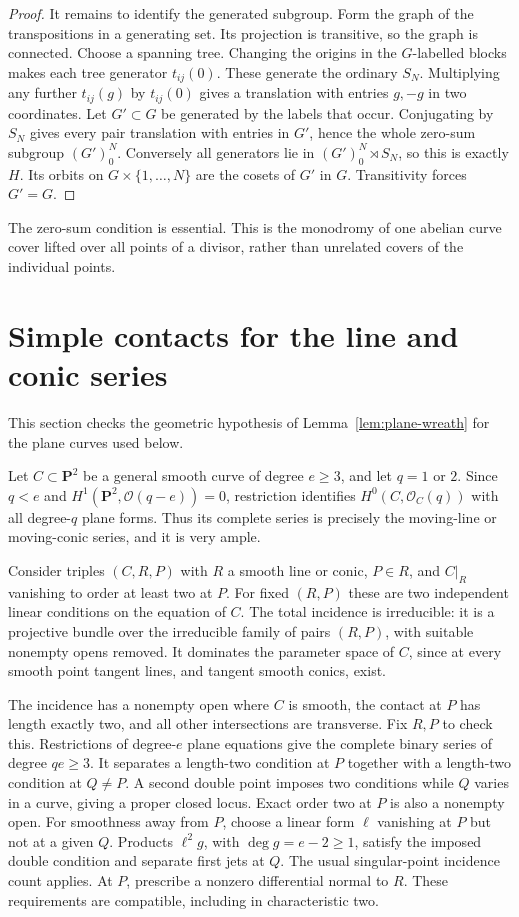 \documentclass[11pt]{article}
\begin{document}
\begin{proof}
It remains to identify the generated subgroup. Form the graph of the transpositions in a generating set. Its projection is transitive, so the graph is connected. Choose a spanning tree. Changing the origins in the $G$-labelled blocks makes each tree generator $t_{ij}(0)$. These generate the ordinary $S_N$. Multiplying any further $t_{ij}(g)$ by $t_{ij}(0)$ gives a translation with entries $g,-g$ in two coordinates. Let $G'\subset G$ be generated by the labels that occur. Conjugating by $S_N$ gives every pair translation with entries in $G'$, hence the whole zero-sum subgroup $(G')_0^N$. Conversely all generators lie in $(G')_0^N\rtimes S_N$, so this is exactly $H$. Its orbits on $G\times\{1,\ldots,N\}$ are the cosets of $G'$ in $G$. Transitivity forces $G'=G$.
\end{proof}

The zero-sum condition is essential. This is the monodromy of one abelian curve cover lifted over all points of a divisor, rather than unrelated covers of the individual points.

\section{Simple contacts for the line and conic series}\label{sec:plane-contact}
This section checks the geometric hypothesis of Lemma~\ref{lem:plane-wreath} for the plane curves used below.

Let $C\subset\mathbf P^2$ be a general smooth curve of degree $e\ge3$, and let $q=1$ or $2$. Since $q<e$ and $H^1(\mathbf P^2,\mathcal O(q-e))=0$, restriction identifies $H^0(C,\mathcal O_C(q))$ with all degree-$q$ plane forms. Thus its complete series is precisely the moving-line or moving-conic series, and it is very ample.

Consider triples $(C,R,P)$ with $R$ a smooth line or conic, $P\in R$, and $C|_R$ vanishing to order at least two at $P$. For fixed $(R,P)$ these are two independent linear conditions on the equation of $C$. The total incidence is irreducible: it is a projective bundle over the irreducible family of pairs $(R,P)$, with suitable nonempty opens removed. It dominates the parameter space of $C$, since at every smooth point tangent lines, and tangent smooth conics, exist.

The incidence has a nonempty open where $C$ is smooth, the contact at $P$ has length exactly two, and all other intersections are transverse. Fix $R,P$ to check this. Restrictions of degree-$e$ plane equations give the complete binary series of degree $qe\ge3$. It separates a length-two condition at $P$ together with a length-two condition at $Q\ne P$. A second double point imposes two conditions while $Q$ varies in a curve, giving a proper closed locus. Exact order two at $P$ is also a nonempty open. For smoothness away from $P$, choose a linear form $\ell$ vanishing at $P$ but not at a given $Q$. Products $\ell^2g$, with $\deg g=e-2\ge1$, satisfy the imposed double condition and separate first jets at $Q$. The usual singular-point incidence count applies. At $P$, prescribe a nonzero differential normal to $R$. These requirements are compatible, including in characteristic two.
\end{document}
